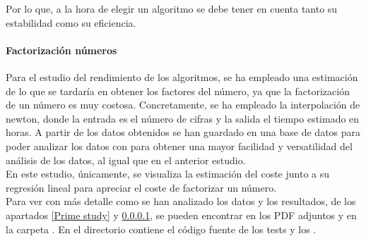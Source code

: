 Por lo que, a la hora de elegir un algoritmo se debe tener en cuenta tanto su estabilidad como su eficiencia.\\
 
\paragraph{Factorización números}\label{Factor study}

Para el estudio del rendimiento de los algoritmos, se ha empleado una estimación de lo que se tardaría en obtener los factores del número, ya que la factorización de un número es muy costosa. Concretamente, se ha empleado la interpolación de newton, donde la entrada es el número de cifras y la salida el tiempo estimado en horas. A partir de los datos obtenidos se han guardado en una base de datos para poder analizar los datos con  para obtener una mayor facilidad y versatilidad del análisis de los datos, al igual que en el anterior estudio.\\

En este estudio, únicamente, se visualiza la estimación del coste junto a su regresión lineal para apreciar el coste de factorizar un número.\\

Para ver con más detalle como se han analizado los datos y los resultados, de los apartados \ref{Prime study} y \ref{Factor study}, se pueden encontrar en los PDF adjuntos y en la carpeta . En el directorio  contiene el código fuente de los tests y los .
